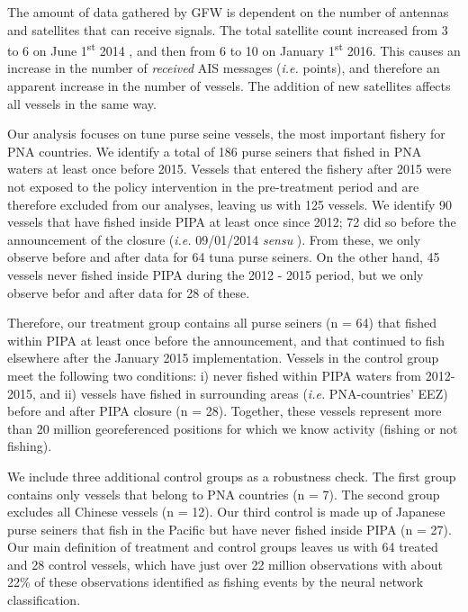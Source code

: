 \documentclass[9p,twocolumn,twoside,lineno]{pnas-new}
\begin{document}
The amount of data gathered by GFW is dependent on the number of antennas and satellites that can receive signals. The total satellite count increased from 3 to 6 on June 1\textsuperscript{st} 2014 , and then from 6 to 10 on January 1\textsuperscript{st} 2016. This causes an increase in the number of \emph{received} AIS messages (\emph{i.e.} points), and therefore an apparent increase in the number of vessels. The addition of new satellites affects all vessels in the same way. 

Our analysis focuses on tune purse seine vessels, the most important fishery for PNA countries. We identify a total of 186 purse seiners that fished in PNA waters at least once before 2015. Vessels that entered the fishery after 2015 were not exposed to the policy intervention in the pre-treatment period and are therefore excluded from our analyses, leaving us with 125 vessels. We identify 90 vessels that have fished inside PIPA at least once since 2012; 72 did so before the announcement of the closure (\emph{i.e.} 09/01/2014 \emph{sensu} \citep{mcdermott_2018}). From these, we only observe before and after data for 64 tuna purse seiners.
On the other hand, 45 vessels never fished inside PIPA during the 2012 - 2015 period, but we only observe befor and after data for 28 of these.

Therefore, our treatment group contains all purse seiners (n = 64) that fished within PIPA at least once before the announcement, and that continued to fish elsewhere after the January 2015 implementation. Vessels in the control group meet the following two conditions: i) never fished within PIPA waters from 2012-2015, and ii) vessels have fished in surrounding areas (\emph{i.e.} PNA-countries' EEZ) before and after PIPA closure (n = 28). Together, these vessels represent more than 20 million georeferenced positions for which we know activity (fishing or not fishing).

We include three additional control groups as a robustness check. The first group contains only vessels that belong to PNA countries (n = 7). The second group excludes all Chinese vessels (n = 12). Our third control is made up of Japanese purse seiners that fish in the Pacific but have never fished inside PIPA (n = 27). Our main definition of treatment and control groups leaves us with 64 treated and 28 control vessels, which have just over 22 million observations with about 22\% of these observations identified as fishing events by the neural network classification.
\end{document}
